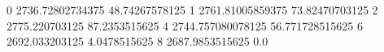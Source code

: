0 2736.72802734375 48.74267578125
1 2761.81005859375 73.82470703125
2 2775.220703125 87.2353515625
4 2744.757080078125 56.771728515625
6 2692.033203125 4.0478515625
8 2687.9853515625 0.0

